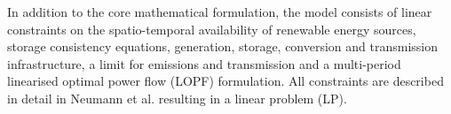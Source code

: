 In addition to the core mathematical formulation, the model consists of linear constraints on the spatio-temporal availability of renewable energy sources, storage consistency equations, generation, storage, conversion and transmission infrastructure, a limit for \co emissions and transmission and a multi-period linearised optimal power flow (LOPF) formulation. All constraints are described in detail in Neumann et al.\cite{Neumann2023} resulting in a linear problem (LP).